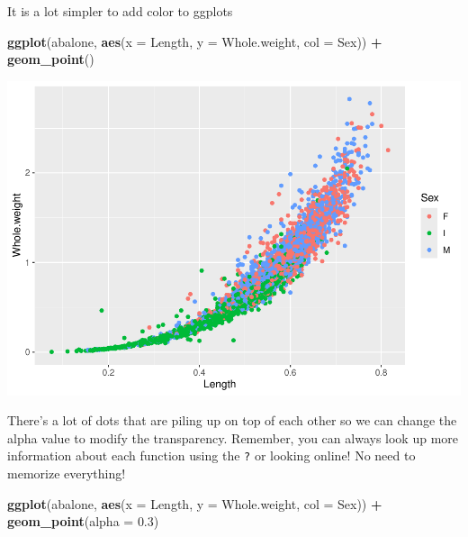 \documentclass[
]{book}
\newenvironment{Shaded}{\begin{snugshade}}{\end{snugshade}}
\newcommand{\AttributeTok}[1]{\textcolor[rgb]{0.13,0.29,0.53}{#1}}
\newcommand{\FloatTok}[1]{\textcolor[rgb]{0.00,0.00,0.81}{#1}}
\newcommand{\FunctionTok}[1]{\textcolor[rgb]{0.13,0.29,0.53}{\textbf{#1}}}
\newcommand{\NormalTok}[1]{#1}
\newcommand{\SpecialCharTok}[1]{\textcolor[rgb]{0.81,0.36,0.00}{\textbf{#1}}}
\begin{document}
It is a lot simpler to add color to ggplots

\begin{Shaded}
\begin{Highlighting}[]
\FunctionTok{ggplot}\NormalTok{(abalone, }\FunctionTok{aes}\NormalTok{(}\AttributeTok{x =}\NormalTok{ Length, }\AttributeTok{y =}\NormalTok{ Whole.weight, }\AttributeTok{col =}\NormalTok{ Sex)) }\SpecialCharTok{+} 
  \FunctionTok{geom\_point}\NormalTok{()}
\end{Highlighting}
\end{Shaded}

\includegraphics{_main_files/figure-latex/unnamed-chunk-45-1.pdf}

There's a lot of dots that are piling up on top of each other so we can change the alpha value to modify the transparency. Remember, you can always look up more information about each function using the \texttt{?} or looking online! No need to memorize everything!

\begin{Shaded}
\begin{Highlighting}[]
\FunctionTok{ggplot}\NormalTok{(abalone, }\FunctionTok{aes}\NormalTok{(}\AttributeTok{x =}\NormalTok{ Length, }\AttributeTok{y =}\NormalTok{ Whole.weight, }\AttributeTok{col =}\NormalTok{ Sex)) }\SpecialCharTok{+} 
  \FunctionTok{geom\_point}\NormalTok{(}\AttributeTok{alpha =} \FloatTok{0.3}\NormalTok{)}
\end{Highlighting}
\end{Shaded}
\end{document}
